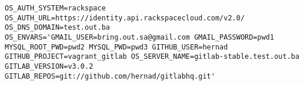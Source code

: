 \documentclass[times, utf8, seminar]{fit}
\begin{document}




\begin{lstlisting}
OS_AUTH_SYSTEM=rackspace
OS_AUTH_URL=https://identity.api.rackspacecloud.com/v2.0/
OS_DNS_DOMAIN=test.out.ba
OS_ENVARS='GMAIL_USER=bring.out.sa@gmail.com GMAIL_PASSWORD=pwd1 MYSQL_ROOT_PWD=pwd2 MYSQL_PWD=pwd3 GITHUB_USER=hernad GITHUB_PROJECT=vagrant_gitlab OS_SERVER_NAME=gitlab-stable.test.out.ba GITLAB_VERSION=v3.0.2 GITLAB_REPOS=git://github.com/hernad/gitlabhq.git'
\end{lstlisting}
\end{document}
